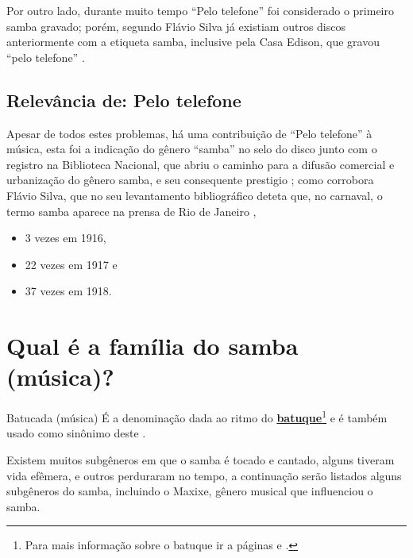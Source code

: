 Por outro lado, durante muito tempo ``Pelo telefone'' foi considerado o primeiro samba gravado;
porém, segundo Flávio Silva  já existiam outros discos anteriormente com a etiqueta samba,
inclusive pela Casa Edison, que gravou ``pelo telefone''  \cite[pp. 96]{hertzman2013making} \cite[pp. 118]{sandroni2001feitico}.

\subsection{Relevância de: Pelo telefone}
Apesar de todos estes problemas, há uma contribuição de ``Pelo telefone'' à música, 
esta foi a indicação do gênero ``samba'' no selo do disco junto com o registro na Biblioteca Nacional,
que abriu o caminho para a difusão comercial e urbanização do gênero samba,
 e seu consequente prestigio \cite{musicapelotelefone} \cite[pp. 49]{diniz2008almanaque};
como corrobora Flávio Silva, que no seu levantamento bibliográfico deteta que, no carnaval, o termo
samba aparece na prensa  de Rio de Janeiro \cite[pp. 118]{sandroni2001feitico}, 
\begin{itemize}
\item 3 vezes em 1916, 
\item 22 vezes em 1917 e
\item 37 vezes em 1918.
\end{itemize}


\section{Qual é a família do samba (música)?}
\label{sec:FamiliaSamba}
\begin{tcbinformation}{Batucada (música)}
É a denominação dada ao ritmo do 
\hyperref[ref:batuquedanca]{\textbf{batuque}}\footnote{Para 
mais informação sobre o batuque ir a páginas \pageref{ref:batuquedanca1800} e \pageref{ref:batuquedanca}.} 
e é também usado como sinônimo deste \cite[pp. 89]{marcondes1977enciclopedia}.
\end{tcbinformation}
Existem muitos subgêneros em que o samba é tocado e cantado, alguns tiveram vida efêmera,
e outros perduraram no tempo, a continuação serão listados alguns subgêneros do samba,
incluindo o Maxixe, gênero musical que influenciou o samba.


